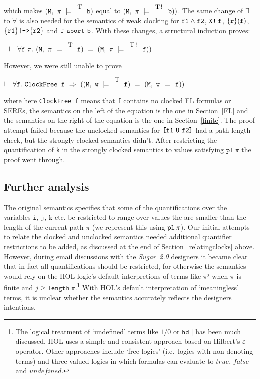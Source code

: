 \documentclass{llncs}
\newcommand{\T}{\texttt{\small\rm{T}}}
\newcommand{\sSem}[4]{(\tt{#1,~#2~\models^{\hspace*{-2.3mm}\raisebox{1mm}{\tt#3}}~#4})}
\renewcommand{\c}{{\hspace*{2.5mm}}}
\newcommand{\fSem}[4]{(\tt{#1,~#2~\models^{\hspace*{-2.3mm}\raisebox{1mm}{\tt#3}}~#4})}
\newcommand{\pl}{\texttt{pl}\xspace}
\newcommand{\FBool}[1]{#1}
\newcommand{\fAnd}[2]{#1 \wedge #2}
\newcommand{\fNext}[1]{\texttt{X!}\hspace*{0.8mm}#1}
\newcommand{\fUntil}[2]{\texttt{[}#1~\texttt{U}~#2\texttt{]}}
\newcommand{\fSuffixImp}[2]{\{#1\}(#2)}
\newcommand{\fWeakImp}[2]{\{#1\}\texttt{|->}\{#2\}}
\newcommand{\fAbort}[2]{#1~\texttt{abort}~#2}
\newcommand\Sugar{{\it{Sugar~2.0}}\xspace}
\renewcommand{\t}[1]{\texttt{#1}}
\begin{document}
which makes $\fSem{M}{\pi}{\T}{\FBool{b}}$ equal to $\sSem{M}{\pi}{\T\texttt{!}}{\FBool{b}})$.
The same change of $\exists$ to $\forall$ is also needed for the semantics of weak clocking for
$\tt{\fAnd{f1}{f2}}$,  $\tt{\fNext{f}}$, $\tt{\fSuffixImp{r}{f}}$, $\tt{\fWeakImp{r1}{r2}}$ and $\tt{\fAbort{f}{b}}$.
With these changes, a structural induction proves:

\medskip

$~~\vdash~\forall{\t{f}}~\pi.~\fSem{M}{\pi}{\T}{f}~=~\sSem{M}{\pi}{\T\texttt{!}}{f})$

\medskip

However, we were still unable to prove

\medskip

$\vdash~\forall{\t{f}}.~\t{ClockFree~f}~\Rightarrow~(\sSem{M}{w}{\T}{f}~=~\sSem{M}{w}{\c}{f})$

\medskip
where here \t{ClockFree~f} means that \t{f} contains no clocked FL
formulas or SEREs, the semantics on the left of the equation is the
one in Section~\ref{FL} and the semantics on the right of the equation
is the one in Section~\ref{finite}.  The proof attempt failed because
the unclocked semantics for $\tt{\fUntil{f1}{f2}}$ had a path length
check, but the strongly clocked semantics didn't. After restricting
the quantification of \t{k} in the strongly clocked semantics to
values satisfying $\pl~\pi$ the proof went through.

\subsection{Further analysis}

The original semantics specifies
that some of the quantifications over the variables
$\t{i}$, $\t{j}$, $\t{k}$ etc.{} be restricted to range over values
the are smaller than the length of the current path $\pi$
(we represent this using $\pl\hspace*{0.5mm}\pi$).
Our initial attempts to relate the clocked and unclocked semantics needed
additional quantifier restrictions to be added, as discussed at the end of
Section~\ref{relatingclocks} above. However, during email discussions with the
\Sugar designers it became clear that in fact all quantifications
should be restricted, for otherwise the semantics would rely on the
HOL logic's default interpretions of terms like $\pi^j$ when $\pi$ is
finite and $j \geq \t{length}~\pi$.\footnote{The logical treatment of
`undefined' terms like $1/0$ or $\t{hd[]}$ has been much
discussed. HOL uses a simple and consistent approach based on
Hilbert's $\varepsilon$-operator. Other approaches include `free
logics' (i.e.~logics with non-denoting terms) and three-valued logics
in which formulas can evaluate to $true$, $false$ and $undefined$.}
With HOL's default interpretation of `meaningless' terms, it is
unclear whether the semantics accurately reflects the designers
intentions.
\end{document}
